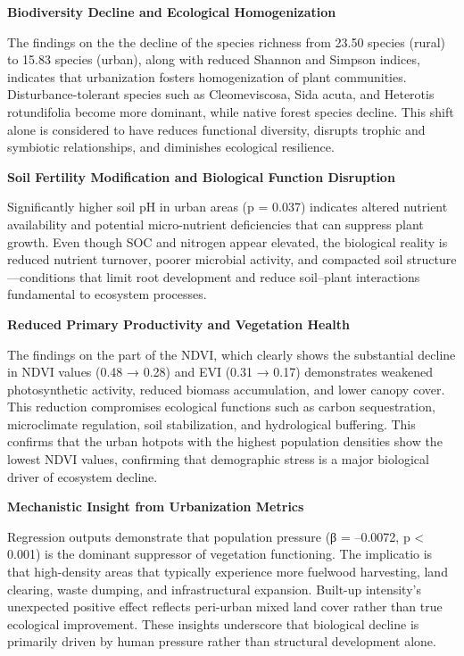 \textbf{Biodiversity Decline and Ecological Homogenization}

The findings on the the decline of the species richness from 23.50 species (rural) to 15.83 species (urban), along with reduced Shannon and Simpson indices, indicates that urbanization fosters homogenization of plant communities. Disturbance-tolerant species such as Cleomeviscosa, Sida acuta, and Heterotis rotundifolia become more dominant, while native forest species decline. This shift alone is considered to have reduces functional diversity, disrupts trophic and symbiotic relationships, and diminishes ecological resilience.

\textbf{Soil Fertility Modification and Biological Function Disruption}

Significantly higher soil pH in urban areas (p = 0.037) indicates altered nutrient availability and potential micro-nutrient deficiencies that can suppress plant growth. Even though SOC and nitrogen appear elevated, the biological reality is reduced nutrient turnover, poorer microbial activity, and compacted soil structure---conditions that limit root development and reduce soil--plant interactions fundamental to ecosystem processes.

\textbf{Reduced Primary Productivity and Vegetation Health}

The findings on the part of the NDVI, which clearly shows the substantial decline in NDVI values (0.48 → 0.28) and EVI (0.31 → 0.17) demonstrates weakened photosynthetic activity, reduced biomass accumulation, and lower canopy cover. This reduction compromises ecological functions such as carbon sequestration, microclimate regulation, soil stabilization, and hydrological buffering. This confirms that the urban hotpots with the highest population densities show the lowest NDVI values, confirming that demographic stress is a major biological driver of ecosystem decline.

\textbf{Mechanistic Insight from Urbanization Metrics}

Regression outputs demonstrate that population pressure (β = --0.0072, p \textless{} 0.001) is the dominant suppressor of vegetation functioning. The implicatio is that high-density areas that typically experience more fuelwood harvesting, land clearing, waste dumping, and infrastructural expansion. Built-up intensity's unexpected positive effect reflects peri-urban mixed land cover rather than true ecological improvement. These insights underscore that biological decline is primarily driven by human pressure rather than structural development alone.

